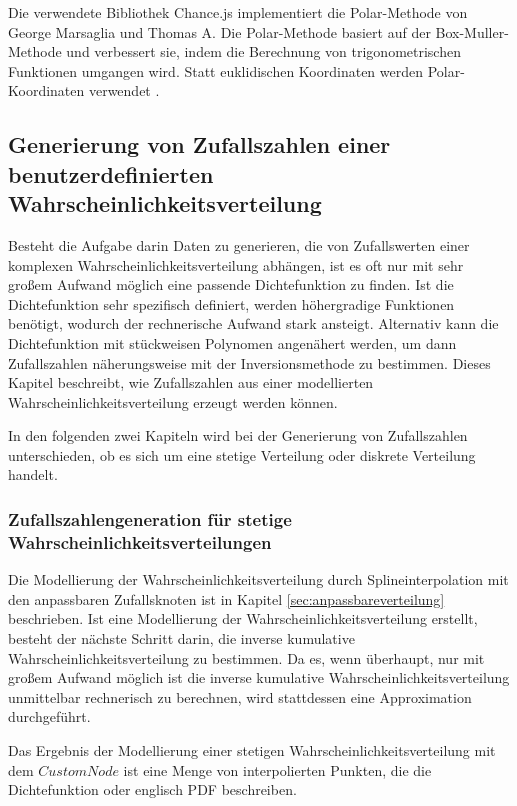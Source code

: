 Die verwendete Bibliothek Chance.js implementiert die Polar-Methode von George Marsaglia und Thomas A. Die Polar-Methode basiert auf der Box-Muller-Methode und verbessert sie, indem die Berechnung von trigonometrischen Funktionen umgangen wird. Statt euklidischen Koordinaten werden Polar-Koordinaten verwendet \cite{polarmethode}.

\subsection{Generierung von Zufallszahlen einer benutzerdefinierten Wahrscheinlichkeitsverteilung}
\label{sec:anpassbareverteilungberechnung}

Besteht die Aufgabe darin Daten zu generieren, die von Zufallswerten einer komplexen Wahrscheinlichkeitsverteilung abhängen, ist es oft nur mit sehr großem Aufwand möglich eine passende Dichtefunktion zu finden. Ist die Dichtefunktion sehr spezifisch definiert, werden höhergradige Funktionen benötigt, wodurch der rechnerische Aufwand stark ansteigt. Alternativ kann die Dichtefunktion mit stückweisen Polynomen angenähert werden, um dann Zufallszahlen näherungsweise mit der Inversionsmethode zu bestimmen. Dieses Kapitel beschreibt, wie Zufallszahlen aus einer modellierten Wahrscheinlichkeitsverteilung erzeugt werden können.

In den folgenden zwei Kapiteln wird bei der Generierung von Zufallszahlen unterschieden, ob es sich um eine stetige Verteilung oder diskrete Verteilung handelt.

\subsubsection{Zufallszahlengeneration für stetige Wahrscheinlichkeitsverteilungen}

Die Modellierung der Wahrscheinlichkeitsverteilung durch Splineinterpolation mit den anpassbaren Zufallsknoten ist in Kapitel \ref{sec:anpassbareverteilung} beschrieben. Ist eine Modellierung der Wahrscheinlichkeitsverteilung erstellt, besteht der nächste Schritt darin, die inverse kumulative Wahrscheinlichkeitsverteilung zu bestimmen. Da es, wenn überhaupt, nur mit großem Aufwand möglich ist die inverse kumulative Wahrscheinlichkeitsverteilung unmittelbar rechnerisch zu berechnen, wird stattdessen eine Approximation durchgeführt. 

Das Ergebnis der Modellierung einer stetigen Wahrscheinlichkeitsverteilung mit dem $CustomNode$ ist eine Menge von interpolierten Punkten, die die Dichtefunktion oder englisch \ac{PDF} beschreiben. 

